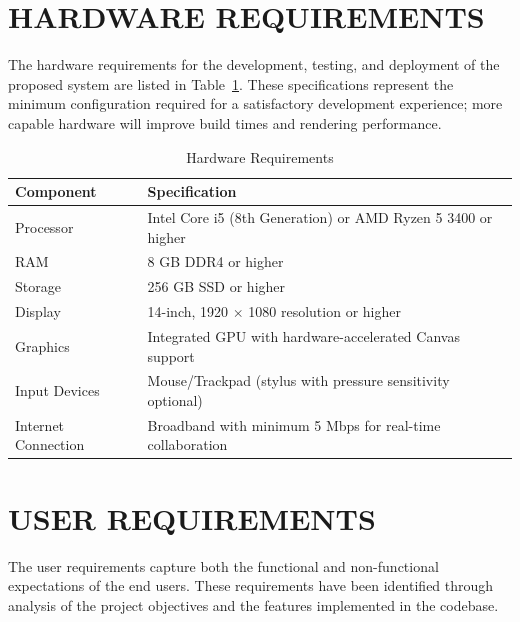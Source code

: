 \documentclass[12pt,a4paper]{report}
\begin{document}
\section{HARDWARE REQUIREMENTS}

The hardware requirements for the development, testing, and deployment of the proposed system are listed in Table~\ref{tab:3.2}. These specifications represent the minimum configuration required for a satisfactory development experience; more capable hardware will improve build times and rendering performance.

\begin{table}[htbp]
  \caption{Hardware Requirements}
  \label{tab:3.2}
  \centering
  \begin{tabular}{@{} l l @{}}
    \toprule
    \textbf{Component}       & \textbf{Specification} \\
    \midrule
    Processor                & Intel Core i5 (8th Generation) or AMD Ryzen 5 3400 or higher \\
    RAM                      & 8 GB DDR4 or higher \\
    Storage                  & 256 GB SSD or higher \\
    Display                  & 14-inch, 1920 $\times$ 1080 resolution or higher \\
    Graphics                 & Integrated GPU with hardware-accelerated Canvas support \\
    Input Devices            & Mouse/Trackpad (stylus with pressure sensitivity optional) \\
    Internet Connection      & Broadband with minimum 5 Mbps for real-time collaboration \\
    \bottomrule
  \end{tabular}
\end{table}

\section{USER REQUIREMENTS}

The user requirements capture both the functional and non-functional expectations of the end users. These requirements have been identified through analysis of the project objectives and the features implemented in the codebase.
\end{document}
